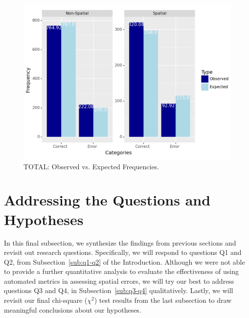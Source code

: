 \begin{figure}[htb]
        \centering
        \includegraphics[width=.7\textwidth]{textual/Figuras/Results/Unknown-83.png}
        \caption{TOTAL: Observed vs. Expected Frequencies.}
        \label{fig:total-chi}
\end{figure}


\section{Addressing the Questions and Hypotheses}

In this final subsection, we synthesize the findings from previous sections and revisit out research questions. Specifically, we will respond to questions Q1 and Q2, from Subsection~\ref{sub:q1-q2} of the Introduction. Although we were not able to provide a further quantitative analysis to evaluate the effectiveness of using automated metrics in assessing spatial errors, we will try our best to address questions Q3 and Q4, in Subsection~\ref{sub:q3-q4} qualitatively. Lastly, we will revisit our final chi-square ($\chi^2$) test results from the last subsection to draw meaningful conclusions about our hypotheses. 


